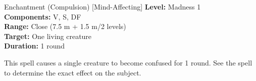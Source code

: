 {Enchantment (Compulsion) [Mind-Affecting]}
{
	\textbf{Level:}
	Madness 1\\
	\textbf{Components:}
	V, S, DF\\
	\textbf{Range:}
	Close (7.5 m + 1.5 m/2 levels)\\
	\textbf{Target:}
	One living creature\\
	\textbf{Duration:}
	1 round\\
}
{
	This spell causes a single creature to become confused for 1 round. See the  spell to determine the exact effect on the subject.

}
